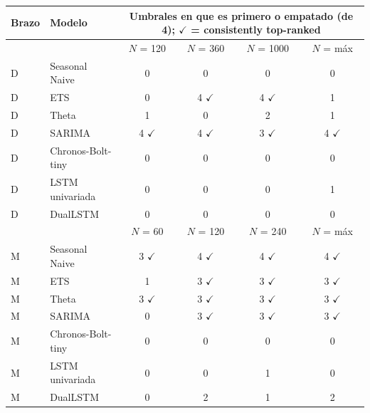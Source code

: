 \begin{tabular}{llcccc}
\toprule
Brazo & Modelo & \multicolumn{4}{c}{Umbrales en que es primero o empatado (de 4); $\checkmark$ = consistently top-ranked} \\
\midrule
 & & $N$ = 120 & $N$ = 360 & $N$ = 1000 & $N$ = máx \\
D & Seasonal Naive & 0 & 0 & 0 & 0 \\
D & ETS & 0 & 4 $\checkmark$ & 4 $\checkmark$ & 1 \\
D & Theta & 1 & 0 & 2 & 1 \\
D & SARIMA & 4 $\checkmark$ & 4 $\checkmark$ & 3 $\checkmark$ & 4 $\checkmark$ \\
D & Chronos-Bolt-tiny & 0 & 0 & 0 & 0 \\
D & LSTM univariada & 0 & 0 & 0 & 1 \\
D & DualLSTM & 0 & 0 & 0 & 0 \\
\midrule
 & & $N$ = 60 & $N$ = 120 & $N$ = 240 & $N$ = máx \\
M & Seasonal Naive & 3 $\checkmark$ & 4 $\checkmark$ & 4 $\checkmark$ & 4 $\checkmark$ \\
M & ETS & 1 & 3 $\checkmark$ & 3 $\checkmark$ & 3 $\checkmark$ \\
M & Theta & 3 $\checkmark$ & 3 $\checkmark$ & 3 $\checkmark$ & 3 $\checkmark$ \\
M & SARIMA & 0 & 3 $\checkmark$ & 3 $\checkmark$ & 3 $\checkmark$ \\
M & Chronos-Bolt-tiny & 0 & 0 & 0 & 0 \\
M & LSTM univariada & 0 & 0 & 1 & 0 \\
M & DualLSTM & 0 & 2 & 1 & 2 \\
\bottomrule
\end{tabular}
